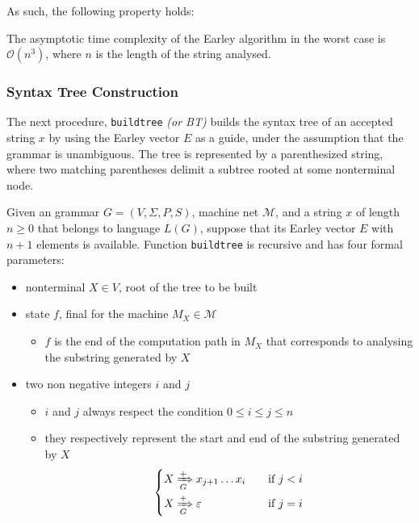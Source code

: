 \documentclass[english]{article}
\begin{document}
As such, the following property holds:

\begin{property}
  The asymptotic time complexity of the Earley algorithm in the worst case is \(\mathcal{O}(n^3)\), where \(n\) is the length of the string analysed.
\end{property}

\subsubsection{Syntax Tree Construction}

The next procedure, \texttt{buildtree} \textit{(or BT)} builds the syntax tree of an accepted string \(x\) by using the Earley vector \(E\) as a guide, under the assumption that the grammar is unambiguous.
The tree is represented by a parenthesized string, where two matching parentheses delimit a subtree rooted at some nonterminal node.

Given an \EBNF grammar \(G = \left( V, \Sigma, P, S \right)\), machine net \(\mathcal{M}\), and a string \(x\) of length \(n \geq 0\) that belongs to language \(L(G)\), suppose that its Earley vector \(E\) with \(n+1\) elements is available.
Function \texttt{buildtree} is recursive and has four formal parameters:

\begin{itemize}
  \item nonterminal \(X \in V\), root of the tree to be built
  \item state \(f\), final for the machine \(M_X \in \mathcal{M}\)
        \begin{itemize}[label=\(\rightarrow\)]
          \item \(f\) is the end of the computation path in \(M_X\) that corresponds to analysing the substring generated by \(X\)
        \end{itemize}
  \item two non negative integers \(i\) and \(j\)
        \begin{itemize}[label=\(\rightarrow\)]
          \item \(i\) and \(j\) always respect the condition \(0 \leq i \leq j \leq n\)
          \item they respectively represent the start and end of the substring generated by \(X\)
                \[ \begin{cases}
                    X \xRightarrow[G]{+} x_{j+1} \ldots x_i \quad & \text{if} \ j < i \\[1.5ex]
                    X \xRightarrow[G]{+} \varepsilon \quad        & \text{if} \ j = i \\
                  \end{cases}  \]
        \end{itemize}
\end{itemize}
\end{document}
